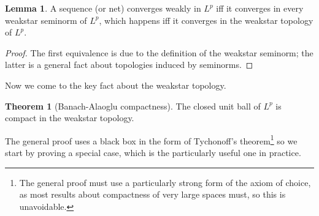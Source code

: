 \documentclass[12pt]{book}
\theoremstyle{definition}
\newtheorem{lemma}[theorem]{Lemma}
\newtheorem{theoremx}[theorem]{Theorem}
\begin{document}
\begin{lemma}
A sequence (or net) converges weakly in $L^p$ iff it converges in every weakstar seminorm of $L^p$, which happens iff it converges in the weakstar topology of $L^p$.
\end{lemma}
\begin{proof}
The first equivalence is due to the definition of the weakstar seminorm; the latter is a general fact about topologies induced by seminorms.
\end{proof}

Now we come to the key fact about the weakstar topology.

\begin{theoremx}[Banach-Alaoglu compactness]
The closed unit ball of $L^p$ is compact in the weakstar topology.
\end{theoremx}

The general proof uses a black box in the form of Tychonoff's theorem\footnote{The general proof must use a particularly strong form of the axiom of choice, as most results about compactness of very large spaces must, so this is unavoidable.} so we start by proving a special case, which is the particularly useful one in practice.
\end{document}
